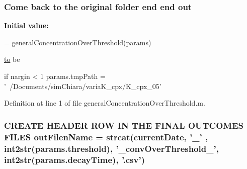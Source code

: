 \hypertarget{a00028_a34c820385e9209f49c18739329ad9206}{
\subsubsection[{out}]{\setlength{\rightskip}{0pt plus 5cm}Come back {\bf to} the original folder {\bf end} {\bf end} out}}\label{a00028_a34c820385e9209f49c18739329ad9206}
{\bfseries Initial value\-:}
\begin{DoxyCode}
= generalConcentrationOverThreshold(params)

      \hyperlink{a00028_af71dbe52628a3f83a77ab494817525c6}{to} be 

\textcolor{keywordflow}{if} nargin < 1
    params.tmpPath = \textcolor{stringliteral}{'~/Documents/simChiara/variaK\_cpx/K\_cpx\_05'}
\end{DoxyCode}


Definition at line 1 of file general\-Concentration\-Over\-Threshold.\-m.

\hypertarget{a00028_af42e186bcb2ad28b937ef14407da1f0d}{
\subsubsection[{out\-Filen\-Name}]{ C\-R\-E\-A\-T\-E H\-E\-A\-D\-E\-R R\-O\-W I\-N T\-H\-E F\-I\-N\-A\-L O\-U\-T\-C\-O\-M\-E\-S F\-I\-L\-E\-S out\-Filen\-Name = strcat({\bf current\-Date}, '\-\_\-' , int2str({\bf params.\-threshold}), '\-\_\-conv\-Over\-Threshold\-\_\-', int2str({\bf params.\-decay\-Time}), '.csv')}}\label{a00028_af42e186bcb2ad28b937ef14407da1f0d}


